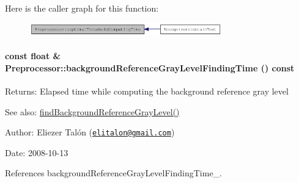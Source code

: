 Here is the caller graph for this function:\nopagebreak
\begin{figure}[H]
\begin{center}
\leavevmode
\includegraphics[width=236pt]{class_preprocessor_72aa2eb5f3a7e7ee0d3ca27ddd6bfc5e_icgraph}
\end{center}
\end{figure}
\hypertarget{class_preprocessor_001ec84b94a5d92a2bce6b854b4d3e7d}{
\paragraph[backgroundReferenceGrayLevelFindingTime]{\setlength{\rightskip}{0pt plus 5cm}const float \& Preprocessor::backgroundReferenceGrayLevelFindingTime () const}\hfill}
\label{class_preprocessor_001ec84b94a5d92a2bce6b854b4d3e7d}


\begin{Desc}
\item[Returns:]Elapsed time while computing the background reference gray level\end{Desc}
\begin{Desc}
\item[See also:]\hyperlink{class_preprocessor_a941f81382bd8e235e4dd12481342be4}{findBackgroundReferenceGrayLevel()}\end{Desc}
\begin{Desc}
\item[Author:]Eliezer Talón (\href{mailto:elitalon@gmail.com}{\tt elitalon@gmail.com}) \end{Desc}
\begin{Desc}
\item[Date:]2008-10-13 \end{Desc}


References backgroundReferenceGrayLevelFindingTime\_\-.

